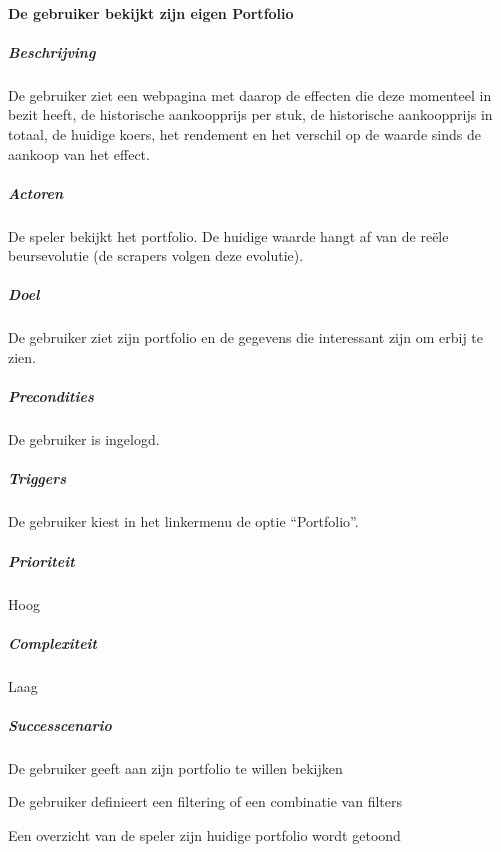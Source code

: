 \paragraph{De gebruiker bekijkt zijn eigen Portfolio}
\begin{compact}
\subparagraph{Beschrijving} De gebruiker ziet een webpagina met daarop de effecten die deze momenteel in bezit heeft, de historische aankoopprijs per stuk, de historische aankoopprijs in totaal, de huidige koers, het rendement en het verschil op de waarde sinds de aankoop van het effect.
\subparagraph{Actoren} De speler bekijkt het portfolio. De huidige waarde hangt af van de re\"ele beursevolutie (de scrapers volgen deze evolutie).
\subparagraph{Doel} De gebruiker ziet zijn portfolio en de gegevens die interessant zijn om erbij te zien.
\subparagraph{Precondities} De gebruiker is ingelogd.
\subparagraph{Triggers} De gebruiker kiest in het linkermenu de optie ``Portfolio''.
\subparagraph{Prioriteit}Hoog
\subparagraph{Complexiteit}Laag
\subparagraph{Successcenario}
\begin{enumerate_compact}
 \item De gebruiker geeft aan zijn portfolio te willen bekijken
 \item De gebruiker definieert een filtering of een combinatie van filters
 \item Een overzicht van de speler zijn huidige portfolio wordt getoond
\end{enumerate_compact}
\end{compact}

